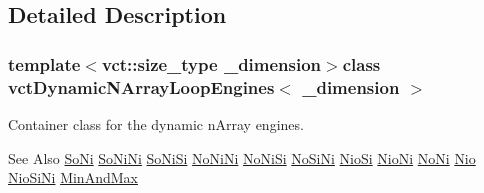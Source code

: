 \subsection{Detailed Description}
\subsubsection*{template$<$vct\-::size\-\_\-type \-\_\-dimension$>$class vct\-Dynamic\-N\-Array\-Loop\-Engines$<$ \-\_\-dimension $>$}

Container class for the dynamic n\-Array engines. 

\begin{DoxySeeAlso}{See Also}
\hyperlink{classvct_dynamic_n_array_loop_engines_1_1_so_ni}{So\-Ni} \hyperlink{classvct_dynamic_n_array_loop_engines_1_1_so_ni_ni}{So\-Ni\-Ni} \hyperlink{classvct_dynamic_n_array_loop_engines_1_1_so_ni_si}{So\-Ni\-Si} \hyperlink{classvct_dynamic_n_array_loop_engines_1_1_no_ni_ni}{No\-Ni\-Ni} \hyperlink{classvct_dynamic_n_array_loop_engines_1_1_no_ni_si}{No\-Ni\-Si} \hyperlink{classvct_dynamic_n_array_loop_engines_1_1_no_si_ni}{No\-Si\-Ni} \hyperlink{classvct_dynamic_n_array_loop_engines_1_1_nio_si}{Nio\-Si} \hyperlink{classvct_dynamic_n_array_loop_engines_1_1_nio_ni}{Nio\-Ni} \hyperlink{classvct_dynamic_n_array_loop_engines_1_1_no_ni}{No\-Ni} \hyperlink{classvct_dynamic_n_array_loop_engines_1_1_nio}{Nio} \hyperlink{classvct_dynamic_n_array_loop_engines_1_1_nio_si_ni}{Nio\-Si\-Ni} \hyperlink{classvct_dynamic_n_array_loop_engines_1_1_min_and_max}{Min\-And\-Max} 
\end{DoxySeeAlso}



